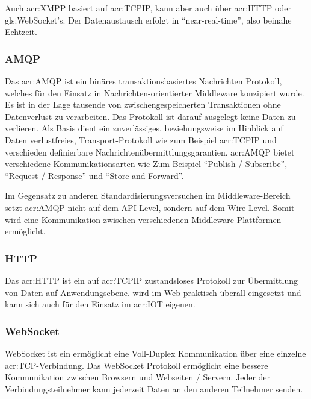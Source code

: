 Auch \gls{acr:XMPP} basiert auf \gls{acr:TCPIP}, kann aber auch über \gls{acr:HTTP} oder \gls{gls:WebSocket}'s. Der Datenaustausch erfolgt in "`near-real-time"', also beinahe Echtzeit.



\subsubsection{AMQP}
Das \gls{acr:AMQP} ist ein binäres transaktionsbasiertes Nachrichten Protokoll, welches für den Einsatz in Nachrichten-orientierter Middleware konzipiert wurde. Es ist in der Lage tausende von zwischengespeicherten Transaktionen ohne Datenverlust zu verarbeiten. Das Protokoll ist darauf ausgelegt keine Daten zu verlieren. Als Basis dient ein zuverlässiges, beziehungsweise im Hinblick auf Daten verlustfreies, Transport-Protokoll wie zum Beispiel \gls{acr:TCPIP} und verschieden definierbare Nachrichtenübermittlungsgarantien. \gls{acr:AMQP} bietet verschiedene Kommunikationsarten wie Zum Beispiel "`Publish / Subscribe"', "`Request / Response"' und "`Store and Forward"'. 

Im Gegensatz zu anderen Standardisierungsversuchen im Middleware-Bereich setzt \gls{acr:AMQP} nicht auf dem API-Level, sondern auf dem Wire-Level. Somit wird eine Kommunikation zwischen verschiedenen Middleware-Plattformen ermöglicht.



\subsubsection{HTTP}
Das \gls{acr:HTTP} ist ein auf \gls{acr:TCPIP} zustandsloses Protokoll zur Übermittlung von Daten auf Anwendungsebene.  wird im Web praktisch überall eingesetzt und kann sich auch für den Einsatz im \gls{acr:IOT} eigenen.



\subsubsection{WebSocket}
WebSocket ist ein ermöglicht eine Voll-Duplex Kommunikation über eine einzelne \gls{acr:TCP}-Verbindung. Das WebSocket Protokoll ermöglicht eine bessere Kommunikation zwischen Browsern und Webseiten / Servern. Jeder der Verbindungsteilnehmer kann jederzeit Daten an den anderen Teilnehmer senden.



